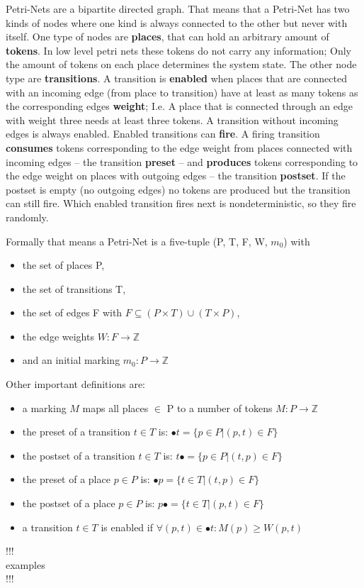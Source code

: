 Petri-Nets are a bipartite directed graph.
That means that a Petri-Net has two kinds of nodes where one kind is always connected to the other but never with itself.
One type of nodes are \textbf{places}, that can hold an arbitrary amount of \textbf{tokens}.
In low level petri nets these tokens do not carry any information; 
Only the amount of tokens on each place determines the system state.
The other node type are \textbf{transitions}.
A transition is \textbf{enabled} when places that are connected with an incoming edge (from place to transition) have at least as many tokens as the corresponding edges \textbf{weight};
I.e. A place that is connected through an edge with weight three needs at least three tokens.
A transition without incoming edges is always enabled.
Enabled transitions can \textbf{fire}.
A firing transition \textbf{consumes} tokens corresponding to the edge weight from places connected with incoming edges -- the transition \textbf{preset} -- and \textbf{produces} tokens corresponding to the edge weight on places with outgoing edges -- the transition \textbf{postset}.
If the postset is empty (no outgoing edges) no tokens are produced but the transition can still fire.
Which enabled transition fires next is nondeterministic, so they fire randomly.

Formally that means a Petri-Net is a five-tuple (P, T, F, W, $m_0$) with
\begin{itemize}
  \setlength\itemsep{-0.3em}
  \item the set of places P,
  \item the set of transitions T,
  \item the set of edges F with $F \subseteq (P \times T) \cup (T \times P)$,
  \item the edge weights $W: F \rightarrow \mathbb{Z} $
  \item and an initial marking $m_0: P \rightarrow \mathbb{Z} $
\end{itemize}
Other important definitions are:
\begin{itemize}
  \setlength\itemsep{-0.3em}
  \item a marking $M$ maps all places $\in$ P to a number of tokens $M: P \rightarrow \mathbb{Z}$
  \item the preset of a transition $t \in T$ is: $\bullet t = \{p \in P | (p,t) \in F\}$
  \item the postset of a transition $t \in T$ is: $t\bullet = \{p \in P | (t,p) \in F\}$
  \item the preset of a place $p \in P$ is: $\bullet p = \{t \in T | (t,p) \in F\}$
  \item the postset of a place $p \in P$ is: $p\bullet = \{t \in T | (p,t) \in F\}$
  \item a transition $t \in T$ is enabled if $\forall (p,t) \in \bullet t: M(p) \geq W(p,t)$
\end{itemize}
!!!\\
examples\\
!!!

